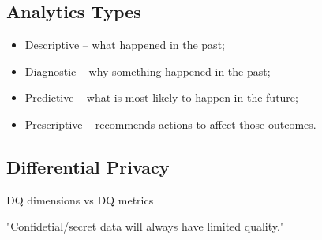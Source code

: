 \subsection{Analytics Types}

\begin{itemize}
    \item Descriptive – what happened in the past;
    \item Diagnostic – why something happened in the past;
    \item Predictive – what is most likely to happen in the future;
    \item Prescriptive – recommends actions to affect those outcomes.
\end{itemize}

\subsection{Differential Privacy}

DQ dimensions vs DQ metrics

"Confidetial/secret data will always have limited quality."
